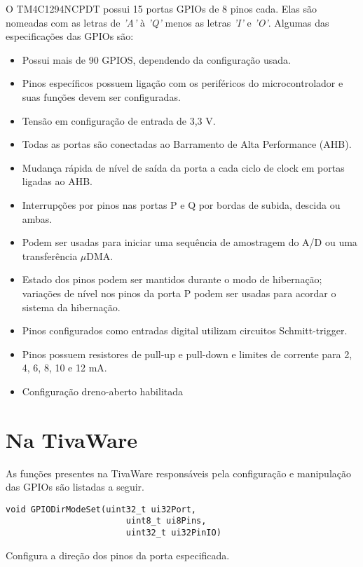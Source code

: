 O TM4C1294NCPDT possui 15 portas GPIOs de 8 pinos cada. Elas são nomeadas com as letras de \emph{'A'} à \emph{'Q'} menos as letras \emph{'I'} e \emph{'O'}. Algumas das especificações das GPIOs são:

\begin{itemize}
	\item Possui mais de 90 GPIOS, dependendo da configuração usada.
	\item Pinos específicos possuem ligação com os periféricos do microcontrolador e suas funções devem ser configuradas.
	\item Tensão em configuração de entrada de 3,3 V.
	\item Todas as portas são conectadas ao Barramento de Alta Performance (AHB).
	\item Mudança rápida de nível de saída da porta a cada ciclo de clock em portas ligadas ao AHB.
	\item Interrupções por pinos nas portas P e Q por bordas de subida, descida ou ambas.
	\item Podem ser usadas para iniciar uma sequência de amostragem do A/D ou uma transferência $\mu$DMA.
	\item Estado dos pinos podem ser mantidos durante o modo de hibernação; variações de nível nos pinos da porta P podem ser usadas para acordar o sistema da hibernação.
	\item Pinos configurados como entradas digital utilizam circuitos Schmitt-trigger.
	\item Pinos possuem resistores de pull-up e pull-down e limites de corrente para 2, 4, 6, 8, 10 e 12 mA.
	\item Configuração dreno-aberto habilitada
\end{itemize}

\section{Na TivaWare}

As funções presentes na TivaWare responsáveis pela configuração e manipulação das GPIOs são listadas a seguir.

\begin{lstlisting}[style=funcao]
	void GPIODirModeSet(uint32_t ui32Port,
						uint8_t ui8Pins,
						uint32_t ui32PinIO)
\end{lstlisting}

Configura a direção dos pinos da porta especificada.

